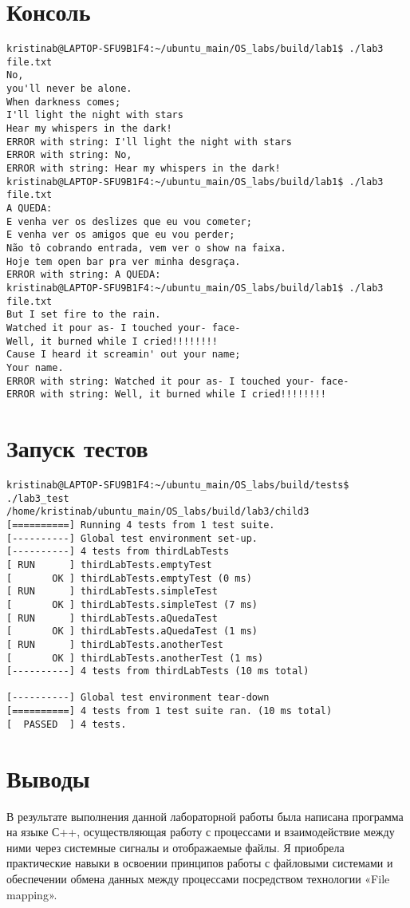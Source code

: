 \documentclass[a4paper, 12pt]{article}
\begin{document}
\section{Консоль}
\begin{verbatim}
kristinab@LAPTOP-SFU9B1F4:~/ubuntu_main/OS_labs/build/lab1$ ./lab3 file.txt
No,
you'll never be alone.
When darkness comes;
I'll light the night with stars
Hear my whispers in the dark!
ERROR with string: I'll light the night with stars
ERROR with string: No,
ERROR with string: Hear my whispers in the dark!
kristinab@LAPTOP-SFU9B1F4:~/ubuntu_main/OS_labs/build/lab1$ ./lab3 file.txt
A QUEDA:
E venha ver os deslizes que eu vou cometer;
E venha ver os amigos que eu vou perder;
Não tô cobrando entrada, vem ver o show na faixa.
Hoje tem open bar pra ver minha desgraça.
ERROR with string: A QUEDA:
kristinab@LAPTOP-SFU9B1F4:~/ubuntu_main/OS_labs/build/lab1$ ./lab3 file.txt
But I set fire to the rain.
Watched it pour as- I touched your- face-
Well, it burned while I cried!!!!!!!!
Cause I heard it screamin' out your name;
Your name.
ERROR with string: Watched it pour as- I touched your- face-
ERROR with string: Well, it burned while I cried!!!!!!!!
\end{verbatim}

\section{Запуск тестов}
\begin{verbatim}
kristinab@LAPTOP-SFU9B1F4:~/ubuntu_main/OS_labs/build/tests$ ./lab3_test
/home/kristinab/ubuntu_main/OS_labs/build/lab3/child3
[==========] Running 4 tests from 1 test suite.
[----------] Global test environment set-up.
[----------] 4 tests from thirdLabTests
[ RUN      ] thirdLabTests.emptyTest
[       OK ] thirdLabTests.emptyTest (0 ms)
[ RUN      ] thirdLabTests.simpleTest
[       OK ] thirdLabTests.simpleTest (7 ms)
[ RUN      ] thirdLabTests.aQuedaTest
[       OK ] thirdLabTests.aQuedaTest (1 ms)
[ RUN      ] thirdLabTests.anotherTest
[       OK ] thirdLabTests.anotherTest (1 ms)
[----------] 4 tests from thirdLabTests (10 ms total)

[----------] Global test environment tear-down
[==========] 4 tests from 1 test suite ran. (10 ms total)
[  PASSED  ] 4 tests.
\end{verbatim}
\newpage

\section{Выводы}

В результате выполнения данной лабораторной работы была написана программа на языке С++, осуществляющая работу с процессами и взаимодействие между ними через системные сигналы и отображаемые файлы. Я приобрела практические навыки в освоении принципов работы с файловыми системами и обеспечении обмена данных между процессами посредством технологии «File mapping».
\end{document}
